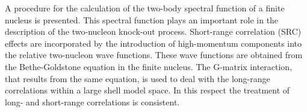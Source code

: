 \begin{WTabstract}%
A procedure for the calculation of the two-body spectral function of a 
finite nucleus is presented. This spectral function plays an important role in 
the description of the two-nucleon knock-out process. 
Short-range correlation (SRC) effects are incorporated by the introduction of
high-momentum components into the relative two-nucleon wave functions. 
These wave functions are obtained from the Bethe-Goldstone equation in the 
finite nucleus. The G-matrix interaction, that results from the same equation,
is used to deal with the long-range correlations within a large shell model 
space. In this respect the treatment of long- and short-range correlations
is consistent.
\end{WTabstract}
